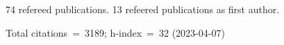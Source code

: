 74 refereed publications. 13 refeered publications as first author.

Total citations~=~3189; h-index~=~32 (2023-04-07)